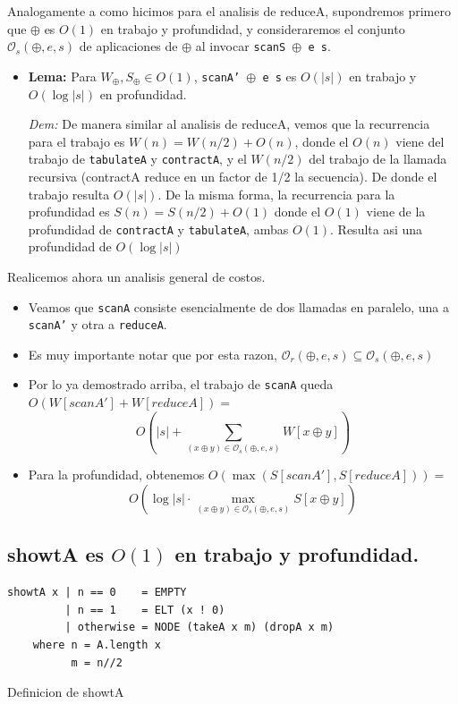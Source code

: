 \documentclass[12pt]{article}
\begin{document}
Analogamente a como hicimos para el analisis de reduceA, supondremos primero que $\oplus$ es $O(1)$ en trabajo y profundidad, y consideraremos el conjunto $\mathcal{O}_s(\oplus,e,s)$ de aplicaciones de $\oplus$ al invocar \texttt{scanS $\oplus$ e s}.

\begin{itemize}
\item \textbf{Lema:} Para $W_\oplus,S_\oplus \in O(1)$, \texttt{scanA' $\oplus$ e s} es $O(|s|)$ en trabajo y $O(\log |s|)$ en profundidad.

 \textit{Dem:} De manera similar al analisis de reduceA, vemos que la recurrencia para el trabajo es $W(n) = W(n/2) + O(n)$, donde el $O(n)$  viene del trabajo de \texttt{tabulateA} y \texttt{contractA}, y el $W(n/2)$ del trabajo de la llamada recursiva (contractA reduce en un factor de 1/2 la secuencia). De donde el trabajo resulta $O(|s|)$. De la misma forma, la recurrencia para la profundidad es $S(n) = S(n/2) + O(1)$ donde el $O(1)$ viene de la profundidad de \texttt{contractA} y \texttt{tabulateA}, ambas $O(1)$. Resulta asi una profundidad de $O(\log |s|)$
\end{itemize}

Realicemos ahora un analisis general de costos.

\begin{itemize}
\item Veamos que \texttt{scanA} consiste esencialmente de dos llamadas en paralelo, una a \texttt{scanA'} y otra a \texttt{reduceA}.

\item Es muy importante notar que por esta razon, $\mathcal{O}_r(\oplus,e,s) \subseteq \mathcal{O}_s(\oplus,e,s)$

\item Por lo ya demostrado arriba, el trabajo de \texttt{scanA} queda $O(W[scanA'] + W[reduceA]) =$ $$O(|s| + \sum\limits_{(x\oplus y)\in\mathcal{O}_s(\oplus,e,s)} W[x\oplus y])$$

\item Para la profundidad, obtenemos $O(\max (S[scanA'], S[reduceA])) = $ $$O(\log |s|\cdot \max\limits_{(x\oplus y)\in\mathcal{O}_s(\oplus,e,s)} S[x\oplus y])$$
\end{itemize}
\subsection{showtA es $O(1)$ en trabajo y profundidad.}

\begin{table}[h]
\begin{lstlisting}
showtA x | n == 0    = EMPTY 
         | n == 1    = ELT (x ! 0)
         | otherwise = NODE (takeA x m) (dropA x m)
    where n = A.length x
          m = n//2
\end{lstlisting}
\caption{Definicion de showtA}
\end{table}
\end{document}

